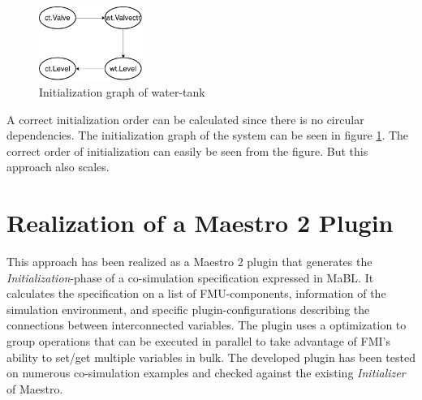 \documentclass[runningheads]{llncs}
\begin{document}
\begin{figure}
  \begin{center}
  \includegraphics[width=0.30\textwidth]{images/InitializationGraph.pdf}
  \end{center}
    \caption{Initialization graph of water-tank}
  \label{fig:initilizationGraph}
\end{figure}
\noindent A correct initialization order can be calculated since there is no circular dependencies. The initialization graph of the system can be seen in figure \ref{fig:initilizationGraph}. The correct order of initialization can easily be seen from the figure. But this approach also scales.%
\newline
\newline
\newline
\newline
\section{Realization of a Maestro 2 Plugin}\label{sc:implementation}
This approach has been realized as a Maestro 2 plugin that generates the \textit{Initialization}-phase of a co-simulation specification expressed in MaBL. It calculates the specification on a list of FMU-components, information of the simulation environment, and specific plugin-configurations describing the connections between interconnected variables. The plugin uses a optimization to group operations that can be executed in parallel to take advantage of FMI's ability to set/get multiple variables in bulk.
The developed plugin has been tested on numerous co-simulation examples and checked against the existing \textit{Initializer} of Maestro.
\end{document}

